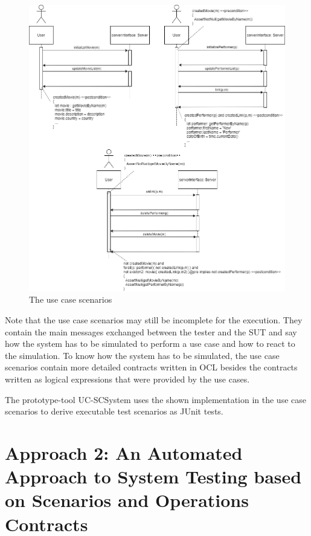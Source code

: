 \begin{figure}[h]
	\centering
	\includegraphics[width=1.0\textwidth]{../images/topic3_ucs.png}
	\caption{The use case scenarios}
	\label{ucs}
\end{figure}

\newpage
Note that the use case scenarios may still be incomplete for the execution. They contain the main messages exchanged between the tester and the SUT and say how the system has to be simulated to perform a use case and how to react to the simulation. To know how the system has to be simulated, the use case scenarios contain more detailed contracts written in OCL besides the contracts written as logical expressions that were provided by the use cases. 

The prototype-tool UC-SCSystem uses the shown implementation in the use case scenarios to derive executable test scenarios as JUnit tests.

\section{Approach 2: An Automated Approach to System Testing based on Scenarios and Operations Contracts} \label{approachtwo}

